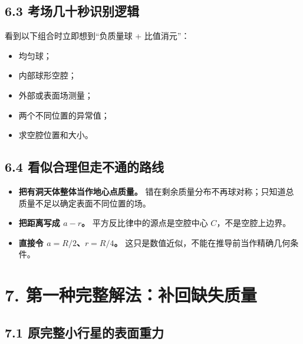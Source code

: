 \documentclass[
  11pt,
  UTF8]{ctexart}
\providecommand{\tightlist}{%
  \setlength{\itemsep}{0pt}\setlength{\parskip}{0pt}}
\begin{document}
\hypertarget{ux8003ux573aux51e0ux5341ux79d2ux8bc6ux522bux903bux8f91}{%
\subsection{6.3
考场几十秒识别逻辑}\label{ux8003ux573aux51e0ux5341ux79d2ux8bc6ux522bux903bux8f91}}

看到以下组合时立即想到``负质量球 + 比值消元''：

\begin{itemize}
\tightlist
\item
  均匀球；
\item
  内部球形空腔；
\item
  外部或表面场测量；
\item
  两个不同位置的异常值；
\item
  求空腔位置和大小。
\end{itemize}

\hypertarget{ux770bux4f3cux5408ux7406ux4f46ux8d70ux4e0dux901aux7684ux8defux7ebf}{%
\subsection{6.4
看似合理但走不通的路线}\label{ux770bux4f3cux5408ux7406ux4f46ux8d70ux4e0dux901aux7684ux8defux7ebf}}

\begin{itemize}
\tightlist
\item
  \textbf{把有洞天体整体当作地心点质量。}
  错在剩余质量分布不再球对称；只知道总质量不足以确定表面不同位置的场。
\item
  \textbf{把距离写成 \(a-r\)。} 平方反比律中的源点是空腔中心
  \(C\)，不是空腔上边界。
\item
  \textbf{直接令 \(a=R/2\)、\(r=R/4\)。}
  这只是数值近似，不能在推导前当作精确几何条件。
\end{itemize}

\hypertarget{ux7b2cux4e00ux79cdux5b8cux6574ux89e3ux6cd5ux8865ux56deux7f3aux5931ux8d28ux91cf}{%
\section{7.
第一种完整解法：补回缺失质量}\label{ux7b2cux4e00ux79cdux5b8cux6574ux89e3ux6cd5ux8865ux56deux7f3aux5931ux8d28ux91cf}}

\hypertarget{ux539fux5b8cux6574ux5c0fux884cux661fux7684ux8868ux9762ux91cdux529b}{%
\subsection{7.1
原完整小行星的表面重力}\label{ux539fux5b8cux6574ux5c0fux884cux661fux7684ux8868ux9762ux91cdux529b}}
\end{document}
